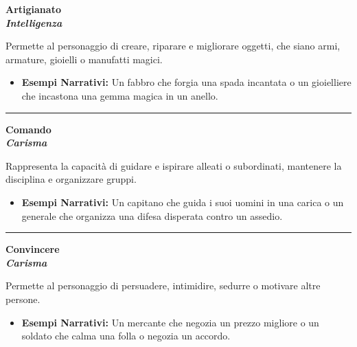 \documentclass[../manuale_main.tex]{subfiles}
\begin{document}
\begin{center}
\textbf{\large{Artigianato}}\\ \textit{\textbf{Intelligenza}}\\
\end{center}
Permette al personaggio di creare, riparare e migliorare oggetti, che siano armi, armature, gioielli o manufatti magici.

\begin{itemize}
\item \textbf{Esempi Narrativi:} Un fabbro che forgia una spada incantata o un gioielliere che incastona una gemma magica in un anello.
\end{itemize}


\vspace{0.5cm}
\noindent
\begin{center}
\rule{\textwidth}{0.4pt} 
\end{center}
\vspace{0.5cm}

\begin{center}
\textbf{\large{Comando}}\\ \textit{\textbf{Carisma}}\\
\end{center}
Rappresenta la capacità di guidare e ispirare alleati o subordinati, mantenere la disciplina e organizzare gruppi.

\begin{itemize}
\item \textbf{Esempi Narrativi:} Un capitano che guida i suoi uomini in una carica o un generale che organizza una difesa disperata contro un assedio.
\end{itemize}


\vspace{0.5cm}
\noindent
\begin{center}
\rule{\textwidth}{0.4pt} 
\end{center}
\vspace{0.5cm}

\begin{center}
\textbf{\large{Convincere}}\\ \textit{\textbf{Carisma}}\\
\end{center}
Permette al personaggio di persuadere, intimidire, sedurre o motivare altre persone.

\begin{itemize}
\item \textbf{Esempi Narrativi:} Un mercante che negozia un prezzo migliore o un soldato che calma una folla o negozia un accordo.
\end{itemize}
\end{document}
